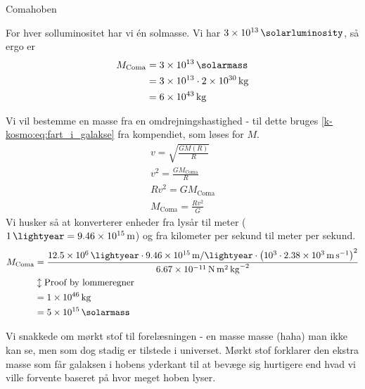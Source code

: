 \documentclass[crop=false, class=memoir]{standalone}
\begin{document}
\begin{opgave}[2]{Comahoben}

\opg For hver solluminositet har vi én solmasse. Vi har $\SI{3e13}{\solarluminosity}$, så ergo er
\begin{align}
    M_{\textup{Coma}} &= \SI{3e13}{\solarmass}\\
    &= \num{3e13}\cdot \SI{2e30}{\kilogram} \\
    &= \SI{6e43}{\kilogram}
\end{align}

\opg Vi vil bestemme en masse fra en omdrejningshastighed - til dette bruges \cref{k-kosmo:eq:fart_i_galakse} fra kompendiet, som løses for $M$.
\begin{align}
    v = \sqrt{\frac{GM(R)}{R}}\\
    v^2 = \frac{GM_{\text{Coma}}}{R}\\
    Rv^2 = GM_{\text{Coma}} \\
    M_{\text{Coma}} = \frac{Rv^2}{G}
\end{align}
Vi husker så at konverterer enheder fra lysår til meter ($\SI{1}{\lightyear} = \SI{9,46e15}{\metre}$) og fra kilometer per sekund til meter per sekund.
\begin{align}
    M_{\text{Coma}} &= \frac{\SI{12,5e6}{\lightyear} \cdot \SI{9,46e15}{\metre \per \lightyear} \cdot \left(\num{e3} \cdot \SI{2,38e3}{\metre \per \second}\right)^2}{\SI{6,67e-11}{\newton \square \metre \per \square \kilogram}} \\
    &\updownarrow{\text{Proof by lommeregner}}\\
    &= \SI{1e46}{\kilogram} \\
    &= \SI{5e15}{\solarmass}
\end{align}

\opg Vi snakkede om mørkt stof til forelæsningen - en masse masse (haha) man ikke kan se, men som dog stadig er tilstede i universet. Mørkt stof forklarer den ekstra masse som får galaksen i hobens yderkant til at bevæge sig hurtigere end hvad vi ville forvente baseret på hvor meget hoben lyser.

\end{opgave}
\end{document}
